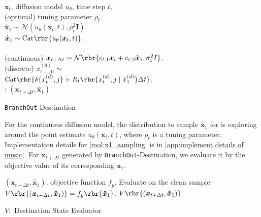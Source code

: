 \begin{module}[htb]
\begin{algorithmic}[1]
 $\boldsymbol{x}_t$, diffusion model $u_\theta$, time step $t$, \\(optional) tuning parameter $\rho_t$.
\\
 $\hat{\boldsymbol{x}}_1 \sim \mathcal{N}(u_\theta(\boldsymbol{x}_t,t), \rho_t^2 \boldsymbol{I})$.\\
 $\hat{\boldsymbol{x}}_1 \sim \text{Cat}\rbr{u_\theta( \boldsymbol{x}_{t},t)}$. \\
\\
\quad (continuous) $\boldsymbol{x}_{t+\Delta t} \sim \mathcal{N}\rbr{c_{t,1} \boldsymbol{x}_t + c_{t,2} \hat{\boldsymbol{x}}_1, \sigma^2_t I}$.\\
\quad(discrete) ${x}_{t+\Delta t}^{(d)} \sim $\\ 
\quad$ \text{Cat}\rbr{\delta\{x_t^{(d)}, j \} + R_t\rbr{{x}_t^{(d)}, j \mid \hat{x}_1^{(d)} } \Delta t }$. \\
: { $(\boldsymbol{x}_{t + \Delta t}, \boldsymbol{\hat{x}}_1)$}
\end{algorithmic}
\caption{\texttt{BranchOut}-Destination}
\label{mol:x1_sampling}
\end{module}


For the continuous diffusion model, the distribution to sample $\hat{\boldsymbol{x}}_1$ for is exploring around the point estimate $u_\theta( \boldsymbol{x}_{t},t)$, where $\rho_t$ is a tuning parameter. Implementation details for \cref{mol:x1_sampling} is in \cref{app:implement details of music}. For $\boldsymbol{x}_{t + \Delta t}$ generated by \texttt{BranchOut}-Destination, we evaluate it by the objective value of its corresponding $\hat{\boldsymbol{x}}_1$.

\begin{vfunction}[htb]
\begin{algorithmic}[1]
 $(\boldsymbol{x}_{t + \Delta t}, \boldsymbol{\hat{x}}_1)$, objective function $f_y$.
\STATE Evaluate on the clean sample:
$V\rbr{(\boldsymbol{x}_{t + \Delta t}, \boldsymbol{\hat{x}}_1)} = f_y\rbr{\boldsymbol{\hat{x}}_1}$.
 { $V\rbr{(\boldsymbol{x}_{t + \Delta t}, \boldsymbol{\hat{x}}_1)}$}
\end{algorithmic}
\caption{$V:$ Destination State Evaluator}
\label{vfunc:clean}
\end{vfunction}


